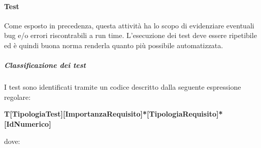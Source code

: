         \paragraph{Test}
        Come esposto in precedenza, questa attività ha lo scopo di evidenziare eventuali bug\glo{} e/o errori riscontrabili a run time. L'esecuzione dei test deve essere ripetibile ed è quindi buona norma renderla quanto più possibile automatizzata.

            \subparagraph{Classificazione dei test}
            I test sono identificati tramite un codice descritto dalla seguente espressione regolare:
            \begin{center}
                \large{\textbf{T[TipologiaTest][ImportanzaRequisito]*[TipologiaRequisito]*[IdNumerico]}}
            \end{center}
            dove:
